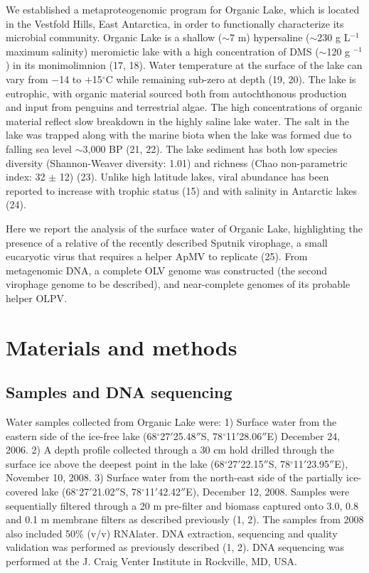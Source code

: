 We established a metaproteogenomic program for Organic Lake, which is located in the Vestfold Hills, East Antarctica, in order to functionally characterize its microbial community. 
Organic Lake is a shallow ($\sim$7 m) hypersaline ($\sim$230 g L$^{-1}$ maximum salinity) meromictic lake with a high concentration of \ac{DMS} ($\sim$120 \textmu{}g $^{-1}$) in its monimolimnion (17, 18). 
Water temperature at the surface of the lake can vary from $-$14 to $+$15$^{\circ}$C while remaining sub-zero at depth (19, 20). 
The lake is eutrophic, with organic material sourced both from autochthonous production and input from penguins and terrestrial algae. 
The high concentrations of organic material reflect slow breakdown in the highly saline lake water. 
The salt in the lake was trapped along with the marine biota when the lake was formed due to falling sea level $\sim$3,000 BP (21, 22). 
The lake sediment has both low species diversity (Shannon-Weaver diversity: 1.01) and richness (Chao non-parametric index: 32 $\pm$ 12) (23). 
Unlike high latitude lakes, viral abundance has been reported to increase with trophic status (15) and with salinity in Antarctic lakes (24). 

Here we report the analysis of the surface water of Organic Lake, highlighting the presence of a relative of the recently described Sputnik virophage, a small eucaryotic virus that requires a helper \ac{ApMV} to replicate (25). 
From metagenomic \textsc{DNA}, a complete \ac{OLV} genome was constructed (the second virophage genome to be described), and near-complete genomes of its probable helper \ac{OLPV}.


\section{Materials and methods}

\subsection{Samples and DNA sequencing}
Water samples collected from Organic Lake were: 1) Surface water from the eastern side of the ice-free lake (68$^{\circ}$27$'$25.48$''$S, 78$^{\circ}$11$'$28.06$''$E) December 24, 2006.
2) A depth profile collected through a 30 cm hold drilled through the surface ice above the deepest point in the lake (68$^{\circ}$27$'$22.15$''$S, 78$^{\circ}$11$'$23.95$''$E), November 10, 2008. 
3) Surface water from the north-east side of the partially ice-covered lake (68$^{\circ}$27$'$21.02$''$S, 78$^{\circ}$11$'$42.42$''$E), December 12, 2008. 
Samples were sequentially filtered through a 20 \textmu{}m pre-filter and biomass captured onto 3.0, 0.8 and 0.1 \textmu{}m membrane filters as described previously (1, 2). 
The samples from 2008 also included 50\% (v/v) \textsc{RNA}later. 
DNA extraction, sequencing and quality validation was performed as previously described (1, 2). 
DNA sequencing was performed at the J. Craig Venter Institute in Rockville, \textsc{MD}, \textsc{USA}.  

